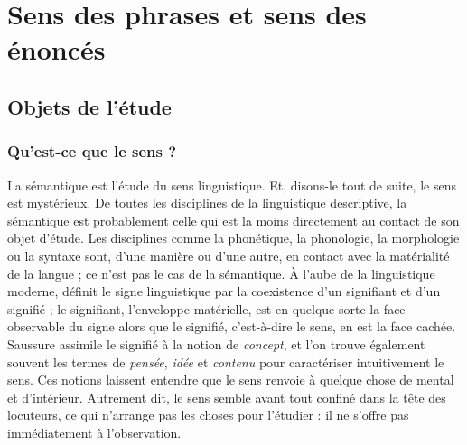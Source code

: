 \chapter{Sens des phrases et sens des énoncés}
\label{Ch:1}
\begin{refsegment}

\section{Objets de l'étude}


\subsection{Qu'est-ce que le sens ?}



La sémantique est l'étude du sens linguistique.  Et, disons-le tout de suite, le sens est mystérieux.  De toutes les disciplines de la linguistique descriptive, la sémantique est probablement celle qui est la moins directement au contact de son objet d'étude. 
Les disciplines comme la phonétique, la phonologie, la morphologie ou la syntaxe sont, d'une manière ou d'une autre, en contact avec la matérialité de la langue ; ce n'est pas le cas de la sémantique. 
À l'aube de la linguistique moderne, \citet{Saussure:16} définit le signe linguistique par la coexistence d'un signifiant et d'un signifié ; le signifiant, l'enveloppe matérielle, est en quelque sorte la face observable du signe alors que le signifié, c'est-à-dire le sens, en est la face cachée.  
Saussure assimile le signifié à la notion de \emph{concept}, et l'on trouve également souvent les termes de \emph{pensée}, \emph{idée} et \emph{contenu} pour caractériser intuitivement le sens.   Ces notions laissent entendre que le sens renvoie à quelque chose de mental et d'intérieur.  Autrement dit, le sens semble avant tout confiné dans la tête des locuteurs, ce qui n'arrange pas les choses pour l'étudier : il ne s'offre pas immédiatement à l'observation.


\end{refsegment}
